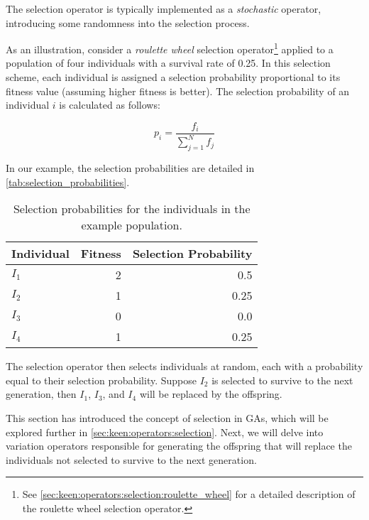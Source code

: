   The selection operator is typically implemented as a \emph{stochastic} operator, introducing some 
  randomness into the selection process.

  As an illustration, consider a \textit{roulette wheel} selection operator\footnote{
    See \vref{sec:keen:operators:selection:roulette_wheel} for a detailed description of the 
    roulette wheel selection operator.
  } applied to a population of four individuals with a survival rate of 0.25.
  In this selection scheme, each individual is assigned a selection probability proportional to its 
  fitness value (assuming higher fitness is better).
  The selection probability of an individual \(i\) is calculated as follows:

  \begin{equation}
    \label{eq:selection_probability}
    p_i = \frac{f_i}{\sum_{j=1}^{N}f_j}
  \end{equation}

  In our example, the selection probabilities are detailed in \vref{tab:selection_probabilities}.

  \begin{table}[ht!]
    \centering
    \begin{tabular}{|l|r|r|}
      \hline
      Individual  & Fitness & Selection Probability \\
      \hline
      \(I_1\)     & 2       & 0.5  \\
      \(I_2\)     & 1       & 0.25   \\
      \(I_3\)     & 0       & 0.0   \\
      \(I_4\)     & 1       & 0.25  \\
      \hline
    \end{tabular}
    \caption{Selection probabilities for the individuals in the example population.}
    \label{tab:selection_probabilities}
  \end{table}

  The selection operator then selects individuals at random, each with a probability equal to their 
  selection probability. 
  Suppose \(I_2\) is selected to survive to the next generation, then \(I_1\), \(I_3\), and \(I_4\) 
  will be replaced by the offspring.

  This section has introduced the concept of selection in GAs, which will be explored further in 
  \vref{sec:keen:operators:selection}. 
  Next, we will delve into variation operators responsible for generating the offspring that will 
  replace the individuals not selected to survive to the next generation.
%